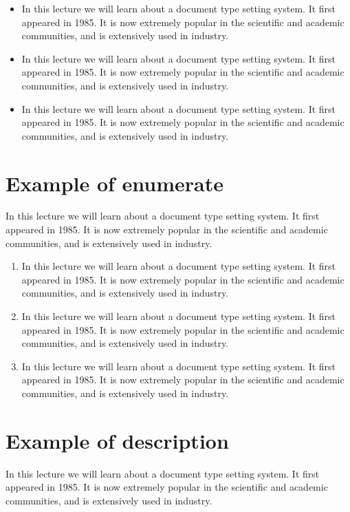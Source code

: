 \documentclass{article}
\begin{document}
\begin{itemize}
\item In this lecture we will learn about a document type setting system. It first
appeared in 1985. It is now extremely popular in the scientific and academic
communities, and is extensively used in industry.
\item In this lecture we will learn about a document type setting system. It first
appeared in 1985. It is now extremely popular in the scientific and academic
communities, and is extensively used in industry.
\item In this lecture we will learn about a document type setting system. It first
appeared in 1985. It is now extremely popular in the scientific and academic
communities, and is extensively used in industry.
\end{itemize}

\section{Example of enumerate}
In this lecture we will learn about a document type setting system. It first
appeared in 1985. It is now extremely popular in the scientific and academic
communities, and is extensively used in industry.

\begin{enumerate}
\item In this lecture we will learn about a document type setting system. It first
appeared in 1985. It is now extremely popular in the scientific and academic
communities, and is extensively used in industry.
\item In this lecture we will learn about a document type setting system. It first
appeared in 1985. It is now extremely popular in the scientific and academic
communities, and is extensively used in industry.
\item In this lecture we will learn about a document type setting system. It first
appeared in 1985. It is now extremely popular in the scientific and academic
communities, and is extensively used in industry.
\end{enumerate}

\section{Example of description}
In this lecture we will learn about a document type setting system. It first
appeared in 1985. It is now extremely popular in the scientific and academic
communities, and is extensively used in industry.
\end{document}
